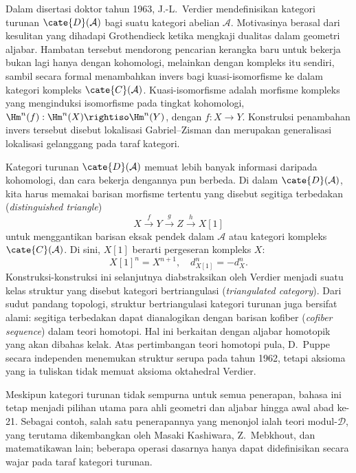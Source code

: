 Dalam disertasi doktor tahun 1963, J.-L.\ Verdier mendefinisikan kategori
turunan $\cate{D}(\mathcal{A})$ bagi suatu kategori abelian $\mathcal{A}$.
Motivasinya berasal dari kesulitan yang dihadapi
Grothendieck ketika mengkaji dualitas dalam geometri aljabar. Hambatan
tersebut mendorong pencarian kerangka baru untuk bekerja bukan lagi hanya
dengan kohomologi, melainkan dengan kompleks itu sendiri, sambil secara
formal menambahkan invers bagi kuasi-isomorfisme ke dalam kategori
kompleks $\cate{C}(\mathcal{A})$. Kuasi-isomorfisme adalah morfisme
kompleks yang menginduksi isomorfisme pada tingkat kohomologi,
$\Hm^n(f): \Hm^n(X) \rightiso \Hm^n(Y)$, dengan $f: X \to Y$.
Konstruksi penambahan invers
tersebut disebut lokalisasi Gabriel--Zisman dan merupakan generalisasi
lokalisasi gelanggang pada taraf kategori.

Kategori turunan $\cate{D}(\mathcal{A})$ memuat lebih banyak informasi
daripada kohomologi, dan cara bekerja dengannya pun berbeda. Di dalam
$\cate{D}(\mathcal{A})$, kita harus memakai barisan morfisme tertentu
yang disebut segitiga terbedakan (\emph{distinguished triangle})
\[ X \xrightarrow{f} Y \xrightarrow{g} Z \xrightarrow{h} X[1] \]
untuk menggantikan barisan eksak pendek dalam $\mathcal{A}$ atau kategori
kompleks $\cate{C}(\mathcal{A})$. Di sini,
$X[1]$ berarti pergeseran kompleks $X$:
\[ X[1]^n = X^{n+1}, \quad d_{X[1]}^n = -d_X^n. \]
Konstruksi-konstruksi ini selanjutnya diabstraksikan oleh Verdier menjadi
suatu kelas struktur yang disebut kategori bertriangulasi
(\emph{triangulated category}). Dari sudut pandang
topologi, struktur bertriangulasi kategori turunan juga bersifat alami:
segitiga terbedakan dapat dianalogikan dengan barisan kofiber
(\emph{cofiber sequence}) dalam teori
homotopi. Hal ini berkaitan dengan aljabar homotopik yang akan dibahas
kelak. Atas pertimbangan teori homotopi pula, D.\ Puppe secara independen
menemukan struktur serupa pada tahun 1962, tetapi aksioma yang ia tuliskan
tidak memuat aksioma oktahedral Verdier.

Meskipun kategori turunan tidak sempurna untuk semua penerapan, bahasa ini
tetap menjadi pilihan utama para ahli geometri dan aljabar hingga awal
abad ke-21. Sebagai contoh, salah satu penerapannya yang menonjol ialah
teori modul-$\mathscr{D}$, yang terutama dikembangkan oleh Masaki Kashiwara,
Z.\ Mebkhout, dan matematikawan lain; beberapa operasi dasarnya hanya
dapat didefinisikan secara wajar pada taraf kategori turunan.


